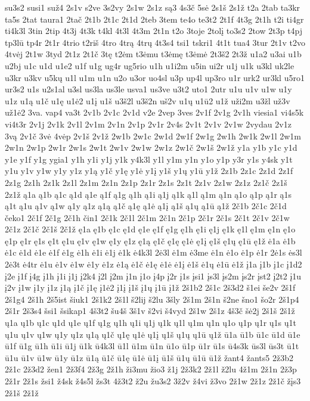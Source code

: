 {su3s2
susi1
suž4
2s1v
s2ve
3s2vy
2s1w
2s1z
są3
4s3č
5sė
2s1š
2s1ž
t2a
2tab
ta3kr
ta5s
2tat
taura1
2tač
2t1b
2t1c
2t1d
2teb
3tem
te4o
te3t2
2t1f
4t3g
2t1h
t2i
ti4gr
ti4k3l
3tin
2tip
4t3j
4t3k
t4kl
4t3l
4t3m
2t1n
t2o
3toje
2tolį
to3s2
2tow
2t3p
t4pj
tp3lū
tp4r
2t1r
4trio
t2riš
4tro
4trą
4trų
4t3s4
tsi1
tskri1
4t1t
tua4
3tur
2t1v
t2vo
4tvėj
2t1w
3tyd
2t1z
2t1č
3tę
t2ėm
t3ėmu
t3ėmę
t3ėmė
2t3š2
2t3ž
u1a2
u3ai
u1b
u2bj
u1c
u1d
u1e2
u1f
u1g
ug4r
ug5rio
u1h
u1i2m
u5in
ui2r
u1j
u1k
u3kl
uk2le
u3kr
u3kv
u5kų
u1l
u1m
u1n
u2o
u3or
uo4sl
u3p
up4l
up3ro
u1r
urk2
ur3kl
u5ro1
ur3s2
u1s
u2s1al
u3sl
us3la
us3le
usva1
us3ve
u3t2
uto1
2utr
u1u
u1v
u1w
u1y
u1z
u1ą
u1č
u1ę
u1ė2
u1į
u1š
u3š2l
u3š2n
uš2v
u1ų
u1ū2
u1ž
uži2m
u3žl
už3v
už1ė2
3va.
vap4
va3t
2v1b
2v1c
2v1d
v2e
2vep
3ves
2v1f
2v1g
2v1h
viesia1
vi4s5k
vi4t3r
2v1j
2v1k
2v1l
2v1m
2v1n
2v1p
2v1r
2v4s
2v1t
2v1v
2v1w
2vydau
2v1z
3vą
2v1č
3vė
4vėp
2v1š
2v1ž
2w1b
2w1c
2w1d
2w1f
2w1g
2w1h
2w1k
2w1l
2w1m
2w1n
2w1p
2w1r
2w1s
2w1t
2w1v
2w1w
2w1z
2w1č
2w1š
2w1ž
y1a
y1b
y1c
y1d
y1e
y1f
y1g
ygia1
y1h
y1i
y1j
y1k
y4k3l
y1l
y1m
y1n
y1o
y1p
y3r
y1s
y4sk
y1t
y1u
y1v
y1w
y1y
y1z
y1ą
y1č
y1ę
y1ė
y1į
y1š
y1ų
y1ū
y1ž
2z1b
2z1c
2z1d
2z1f
2z1g
2z1h
2z1k
2z1l
2z1m
2z1n
2z1p
2z1r
2z1s
2z1t
2z1v
2z1w
2z1z
2z1č
2z1š
2z1ž
ą1a
ą1b
ą1c
ą1d
ą1e
ą1f
ą1g
ą1h
ą1i
ą1j
ą1k
ą1l
ą1m
ą1n
ą1o
ą1p
ą1r
ą1s
ą1t
ą1u
ą1v
ą1w
ą1y
ą1z
ą1ą
ą1č
ą1ę
ą1ė
ą1į
ą1š
ą1ų
ą1ū
ą1ž
2č1b
2č1c
2č1d
čeko1
2č1f
2č1g
2č1h
čin1
2č1k
2č1l
2č1m
2č1n
2č1p
2č1r
2č1s
2č1t
2č1v
2č1w
2č1z
2č1č
2č1š
2č1ž
ę1a
ę1b
ę1c
ę1d
ę1e
ę1f
ę1g
ę1h
ę1i
ę1j
ę1k
ę1l
ę1m
ę1n
ę1o
ę1p
ę1r
ę1s
ę1t
ę1u
ę1v
ę1w
ę1y
ę1z
ę1ą
ę1č
ę1ę
ę1ė
ę1į
ę1š
ę1ų
ę1ū
ę1ž
ė1a
ė1b
ė1c
ė1d
ė1e
ė1f
ė1g
ė1h
ė1i
ė1j
ė1k
ė4k3l
2ė3l
ė1m
ė3me
ė1n
ė1o
ė1p
ė1r
2ė1s
ės3l
2ė3t
ė4tr
ė1u
ė1v
ė1w
ė1y
ė1z
ė1ą
ė1č
ė1ę
ė1ė
ė1į
ė1š
ė1ų
ė1ū
ė1ž
į1a
į1b
į1c
į1d2
į2e
į1f
į4g
į1h
į1i
į1j
į2k4
į2l
į2m
į1n
į1o
į4p
į2r
į1s
įsi1
įs3l
įs2m
įs2r
įst2
į2t2
į1u
į2v
į1w
į1y
į1z
į1ą
į1č
į1ę
į1ė2
į1į
į1š
į1ų
į1ū
į1ž
2š1b2
2š1c
2š3d2
š1ei
še2v
2š1f
2š1g4
2š1h
2š5ist
šiuk1
2š1k2
2š1l
š2lij
š2lu
3šly
2š1m
2š1n
š2ne
šno1
šo2r
2š1p4
2š1r
2š3s4
šsi1
šsikap1
4š3t2
šu4š
3š1v
š2vi
š4vyd
2š1w
2š1z
4š3č
šė2j
2š1š
2š1ž
ų1a
ų1b
ų1c
ų1d
ų1e
ų1f
ų1g
ų1h
ų1i
ų1j
ų1k
ų1l
ų1m
ų1n
ų1o
ų1p
ų1r
ų1s
ų1t
ų1u
ų1v
ų1w
ų1y
ų1z
ų1ą
ų1č
ų1ę
ų1ė
ų1į
ų1š
ų1ų
ų1ū
ų1ž
ū1a
ū1b
ū1c
ū1d
ū1e
ū1f
ū1g
ū1h
ū1i
ū1j
ū1k
ū4k3l
ū1l
ū1m
ū1n
ū1o
ū1p
ū1r
ū1s
ū4s3k
ūs3l
ūs3t
ū1t
ū1u
ū1v
ū1w
ū1y
ū1z
ū1ą
ū1č
ū1ę
ū1ė
ū1į
ū1š
ū1ų
ū1ū
ū1ž
žant4
žants5
2ž3b2
2ž1c
2ž3d2
žen1
2ž3f4
2ž3g
2ž1h
ži3mu
žio3
ž1j
2ž3k2
2ž1l
ž2lu
4ž1m
2ž1n
2ž3p
2ž1r
2ž1s
žsi1
ž4sk
ž4s5l
žs3t
4ž3t2
ž2u
žu3s2
3ž2v
ž4vi
ž3vo
2ž1w
2ž1z
2ž1č
žįs3
2ž1š
2ž1ž
}
